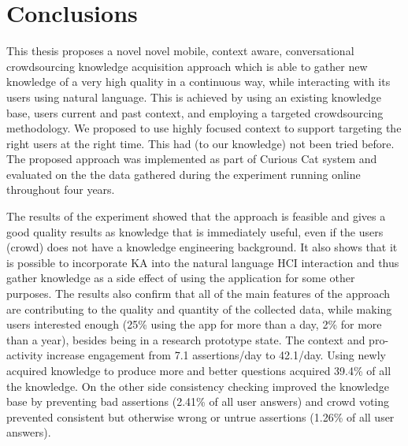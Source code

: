 % 
\chapter{Conclusions}
\label{chapter:conclusions}
This thesis proposes a novel novel mobile, context aware,
conversational crowdsourcing knowledge acquisition approach which is able to 
gather new knowledge of a very high quality in a continuous way, while 
interacting with its users using natural language. This is achieved by using an
existing knowledge base, users current and past context, and employing a 
targeted crowdsourcing methodology. We proposed to use highly focused context 
to support targeting the right users 
at the right time. This had (to our knowledge) not been tried before. The
proposed approach was implemented as part of Curious Cat system and evaluated 
on the the data gathered during the experiment running online throughout four 
years. 

The results of the experiment showed that the approach is feasible and gives a 
good quality results as knowledge that is immediately useful, even if the users 
(crowd) does not have a knowledge engineering background. It also shows that
it is possible to incorporate KA into the natural language HCI interaction and 
thus gather knowledge as a side effect of using the application for some other
purposes. The results also confirm that all of the main features 
of the approach are contributing to the quality and quantity of the collected 
data, while making users interested enough (25\% using the app for more than a 
day, 2\% for more than a year), besides being in a research prototype state. 
The context and pro-activity increase engagement from 7.1 assertions/day to 
42.1/day. Using newly acquired knowledge to produce more and better questions 
acquired 39.4\% of all the knowledge. On the other side consistency checking 
improved the knowledge base by preventing bad assertions (2.41\% of all user 
answers) and crowd voting prevented consistent but otherwise wrong or untrue 
assertions (1.26\% of all user answers).

